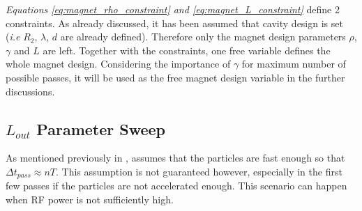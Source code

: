 \documentclass[a4paper,oneside,12pt]{report}
\numberwithin{equation}{chapter}
\begin{document}
\textit{Equations \ref{eq:magnet_rho_constraint} and \ref{eq:magnet_L_constraint}} define 2 constraints. As already discussed, it has been assumed that cavity design is set (\textit{i.e} $R_2$, $\lambda$, $d$ are already defined).
Therefore only the magnet design parameters $\rho$, $\gamma$ and $L$ are left. Together with the constraints, one free variable defines the whole magnet design. 
Considering the importance of $\gamma$ for maximum number of possible passes, it will be used as the free magnet design variable in the further discussions.


\subsection{$L_{out}$ Parameter Sweep} \label{sec:parameter_sweep}

As mentioned previously in ,  assumes that the particles are fast enough so that $\Delta t_{pass} \approx n T$. 
This assumption is not guaranteed however, especially in the first few passes if the particles are not accelerated enough. 
This scenario can happen when RF power is not sufficiently high. 
\end{document}
